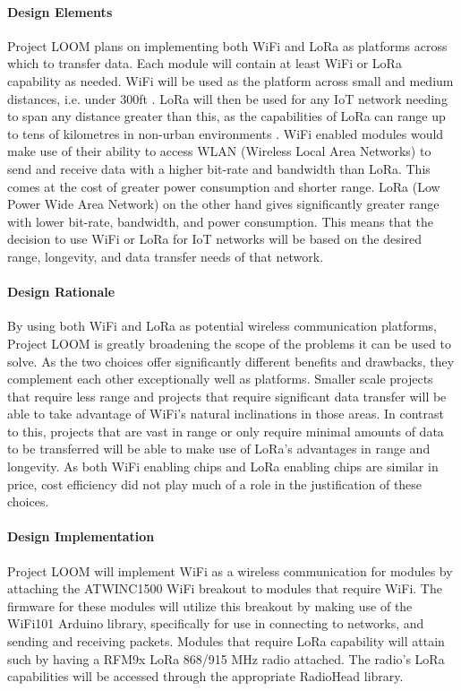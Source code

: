 \documentclass[onecolumn, draftclsnofoot,10pt, compsoc]{IEEEtran}
\begin{document}
\paragraph{Design Elements}
    Project LOOM plans on implementing both WiFi and LoRa as platforms across which to transfer data. Each module will contain at least WiFi or LoRa capability as needed. WiFi will be used as the platform across small and medium distances, i.e. under 300ft \cite{WiFi}. LoRa will then be used for any IoT network needing to span any distance greater than this, as the capabilities of LoRa can range up to tens of kilometres in non-urban environments \cite{LoRa}. WiFi enabled modules would make use of their ability to access WLAN (Wireless Local Area Networks) to send and receive data with a higher bit-rate and bandwidth than LoRa. This comes at the cost of greater power consumption and shorter range. LoRa (Low Power Wide Area Network) on the other hand gives significantly greater range with lower bit-rate, bandwidth, and power consumption. This means that the decision to use WiFi or LoRa for IoT networks will be based on the desired range, longevity, and data transfer needs of that network.

\paragraph{Design Rationale}
    By using both WiFi and LoRa as potential wireless communication platforms, Project LOOM is greatly broadening the scope of the problems it can be used to solve. As the two choices offer significantly different benefits and drawbacks, they complement each other exceptionally well as platforms. Smaller scale projects that require less range and projects that require significant data transfer will be able to take advantage of WiFi's natural inclinations in those areas. In contrast to this, projects that are vast in range or only require minimal amounts of data to be transferred will be able to make use of LoRa's advantages in range and longevity. As both WiFi enabling chips and LoRa enabling chips are similar in price, cost efficiency did not play much of a role in the justification of these choices. 

\paragraph{Design Implementation}
    Project LOOM will implement WiFi as a wireless communication for modules by attaching the ATWINC1500 WiFi breakout to modules that require WiFi. The firmware for these modules will utilize this breakout by making use of the WiFi101 Arduino library, specifically for use in connecting to networks, and sending and receiving packets. Modules that require LoRa capability will attain such by having a RFM9x LoRa 868/915 MHz radio attached. The radio's LoRa capabilities will be accessed through the appropriate RadioHead library. 
\end{document}
